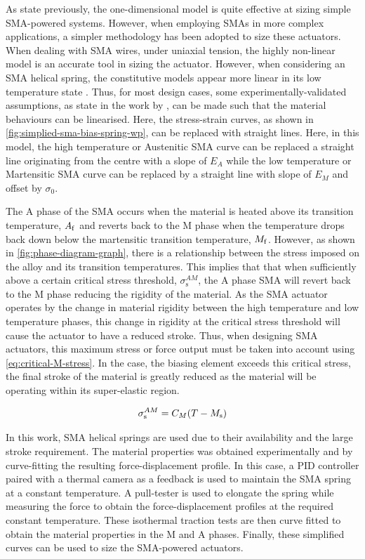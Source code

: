 As state previously, the one-dimensional model is quite effective at sizing simple SMA-powered systems. However, when employing SMAs in more complex applications, a simpler methodology has been adopted to size these actuators. When dealing with SMA wires, under uniaxial tension, the highly non-linear \cite{brinsonOneDimensionalConstitutiveBehavior1993} model is an accurate tool in sizing the actuator. However, when considering an SMA helical spring, the constitutive models appear more linear in its low temperature state \todocite. Thus, for most design cases, some experimentally-validated assumptions, as state in the work by \cite{dragoniDesignDevelopmentAdvanced2021}, can be made such that the material behaviours can be linearised. Here, the stress-strain curves, as shown in \cref{fig:simplied-sma-bias-spring-wp}, can be replaced with straight lines. Here, in this model, the high temperature or Austenitic SMA curve can be replaced a straight line originating from the centre with a slope of $E_A$ while the low temperature or Martensitic SMA curve can be replaced by a straight line with slope of $E_M$ and offset by $\sigma_0$.

The A phase of the SMA occurs when the material is heated above its transition temperature, $A_\mathrm{f}$ and reverts back to the M phase when the temperature drops back down below the martensitic transition temperature, $M_\mathrm{f}$. However, as shown in \cref{fig:phase-diagram-graph}, there is a relationship between the stress imposed on the alloy and its transition temperatures. This implies that that when sufficiently above a certain critical stress threshold, $\sigma_\mathrm{s}^{AM}$, the A phase SMA will revert back to the M phase reducing the rigidity of the material. As the SMA actuator operates by the change in material rigidity between the high temperature and low temperature phases, this change in rigidity at the critical stress threshold will cause the actuator to have a reduced stroke. Thus, when designing SMA actuators, this maximum stress or force output must be taken into account using \cref{eq:critical-M-stress}. In the case, the biasing element exceeds this critical stress, the final stroke of the material is greatly reduced as the material will be operating within its super-elastic region.

\begin{equation}\label{eq:critical-M-stress}
    \sigma_\mathrm{s}^{AM} = C_M (T-M_\mathrm{s})
\end{equation}

In this work, SMA helical springs are used due to their availability and the large stroke requirement. The material properties was obtained experimentally and by curve-fitting the resulting force-displacement profile. In this case, a PID controller paired with a thermal camera as a feedback is used to maintain the SMA spring at a constant temperature. A pull-tester is used to elongate the spring while measuring the force to obtain the force-displacement profiles at the required constant temperature. These isothermal traction tests are then curve fitted to obtain the material properties in the M and A phases. Finally, these simplified curves can be used to size the SMA-powered actuators.

